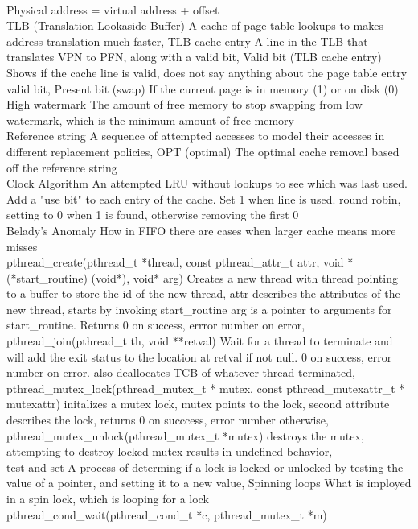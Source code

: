 \documentclass[3pt]{article}
\begin{document}
\\
Physical address = virtual address + offset
\\
TLB (Translation-Lookaside Buffer)
A cache of page table lookups to makes address translation much faster,
TLB cache entry
A line in the TLB that translates VPN to PFN, along with a valid bit,
Valid bit (TLB cache entry)
Shows if the cache line is valid, does not say anything about the page table entry valid bit,
Present bit (swap)
If the current page is in memory (1) or on disk (0)
\\
High watermark
The amount of free memory to stop swapping from low watermark, which is the minimum amount of free memory
\\
Reference string
A sequence of attempted accesses to model their accesses in different replacement policies,
OPT (optimal)
The optimal cache removal based off the reference string
\\
Clock Algorithm
An attempted LRU without lookups to see which was last used. Add a "use bit" to each entry of the cache. Set 1 when line is used. round robin, setting to 0 when 1 is found, otherwise removing the first 0
\\
Belady’s Anomaly
How in FIFO there are cases when larger cache means more misses
\\
pthread\_create(pthread\_t *thread, const pthread\_attr\_t attr, void *(*start\_routine) (void*), void* arg)
Creates a new thread with thread pointing to a buffer to store the id of the new thread, attr describes the attributes of the new thread, starts by invoking start\_routine arg is a pointer to arguments for start\_routine. Returns 0 on success, errror number on error,
pthread\_join(pthread\_t th, void **retval)
Wait for a thread to terminate and will add the exit status to the location at retval if not null. 0 on success, error number on error. also deallocates TCB of whatever thread terminated,
pthread\_mutex\_lock(pthread\_mutex\_t * mutex, const pthread\_mutexattr\_t * mutexattr)
initalizes a mutex lock, mutex points to the lock, second attribute describes the lock, returns 0 on succcess, error number otherwise,
pthread\_mutex\_unlock(pthread\_mutex\_t *mutex)
destroys the mutex, attempting to destroy locked mutex results in undefined behavior,
\\
test-and-set
A process of determing if a lock is locked or unlocked by testing the value of a pointer, and setting it to a new value,
Spinning loops
What is imployed in a spin lock, which is looping for a lock
\\
pthread\_cond\_wait(pthread\_cond\_t *c, pthread\_mutex\_t *m)
\end{document}
